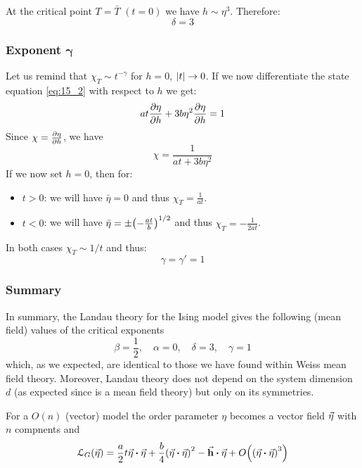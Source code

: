 \documentclass[../../Main/Main.tex]{subfiles}
\begin{document}
At the critical point \( T= \bar{T}  \) \( (t=0) \) we have \( h \sim \eta ^3 \). Therefore:
\begin{equation*}
  \delta =3
\end{equation*}


\subsubsection{Exponent \( \pmb{\gamma}   \)}
Let us remind that \( \chi _T \sim t^{- \gamma  } \) for \( h=0 \), \( \abs{t} \rightarrow 0  \).
If we now differentiate the state equation \eqref{eq:15_2} with respect to \( h \) we get:
\begin{equation*}
  a t \pdv{\eta }{h} + 3 b \eta ^2 \pdv{\eta }{h} = 1
\end{equation*}
Since \( \chi = \pdv{\eta }{h} \), we have
\begin{equation*}
  \chi = \frac{1}{at+3 b \eta ^2}
\end{equation*}
If we now set \( h=0 \), then for:
\begin{itemize}
\item \( t>0 \): we will have \( \bar{\eta } = 0  \) and thus \( \chi _T =  \frac{1}{at} \).
\item \( t<0 \): we will have \( \bar{\eta } = \pm \qty(- \frac{at}{b})^{1/2}   \) and thus \( \chi _T = - \frac{1}{2at} \).
\end{itemize}
In both cases \( \chi _T \sim  1/t \) and thus:
\begin{equation*}
  \gamma = \gamma' = 1
\end{equation*}

\subsubsection{Summary}
In summary, the Landau theory for the Ising model gives the following (mean field) values of the critical exponents
\begin{equation}
  \beta = \frac{1}{2}, \quad \alpha =0, \quad \delta =3, \quad \gamma =1
\end{equation}
which, as we expected, are identical to those we have found within Weiss mean field theory. Moreover, Landau theory does not depend on the system dimension \( d \) (as expected since is a mean field theory) but only on its symmetries.

\begin{remark}
For a \( O(n) \) (vector) model the order parameter \( \eta  \) becomes a vector field \( \va{\eta } \) with \( n \) compnents and
\begin{equation}
  \mathcal{L}_G ( \va{\eta }) = \frac{a}{2} t \va{\eta } \vdot \va{\eta } + \frac{b}{4} \qty(\va{\eta } \vdot \va{\eta } )^2 - \va{h} \vdot \va{\eta } + O \qty(\qty(\va{\eta } \vdot \va{\eta })^3 )
\end{equation}
\end{remark}
\end{document}
